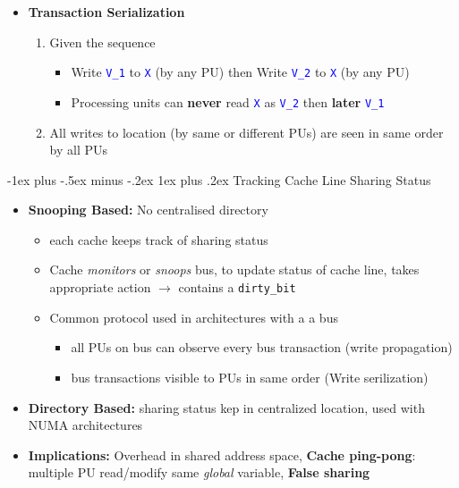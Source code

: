 \documentclass[10pt,landscape]{article}
\makeatletter
\newcommand{\subsubsubsection}{\@startsection{subsubsection}{3}{0mm}%
                                {-1ex plus -.5ex minus -.2ex}%
                                {1ex plus .2ex}%
                                {\normalfont\scriptsize\bfseries}}
\makeatother
\begin{document}
\begin{multicols*}{3}
\begin{itemize}[topsep=0pt,noitemsep,wide=0pt, leftmargin=\dimexpr{} + 2\relax]
\begin{enumerate}[topsep=0pt,noitemsep,wide=0pt, leftmargin=\dimexpr\labelwidth + 2\labelsep\relax]
    \end{enumerate}
    \item \textbf{Transaction Serialization}
    \begin{enumerate}[topsep=0pt,noitemsep,wide=0pt, leftmargin=\dimexpr\labelwidth + 2\labelsep\relax]
        \item Given the sequence 
        \begin{itemize}[topsep=0pt,noitemsep,wide=0pt, leftmargin=\dimexpr{} + 2\relax]
            \item Write \textcolor{blue}{\texttt{V\_1}} to \textcolor{blue}{\texttt{X}} (by any PU) then Write \textcolor{blue}{\texttt{V\_2}} to \textcolor{blue}{\texttt{X}} (by any PU)
            \item Processing units can \textbf{never} read \textcolor{blue}{\texttt{X}} as \textcolor{blue}{\texttt{V\_2}} then \textbf{later} \textcolor{blue}{\texttt{V\_1}}
        \end{itemize}
        \item All writes to location (by same or different PUs) are seen in same order by all PUs
    \end{enumerate}
\end{itemize}

\subsubsubsection{Tracking Cache Line Sharing Status}
\begin{itemize}[topsep=0pt,noitemsep,wide=0pt, leftmargin=\dimexpr{} + 2\relax]
    \item \textbf{Snooping Based:} No centralised directory
    \begin{itemize}[topsep=0pt,noitemsep,wide=0pt, leftmargin=\dimexpr{} + 2\relax]
        \item each cache keeps track of sharing status
        \item Cache \textit{monitors} or \textit{snoops} bus, to update status of cache line, takes appropriate action  $\rightarrow$ contains a \verb|dirty_bit|
        \item Common protocol used in architectures with a a bus
        \begin{itemize}[topsep=0pt,noitemsep,wide=0pt, leftmargin=\dimexpr{} + 2\relax]
            \item all PUs on bus can observe every bus transaction (write propagation)
            \item bus transactions visible to PUs in same order (Write serilization)
        \end{itemize}
    \end{itemize}
    \item \textbf{Directory Based:} sharing status kep in centralized location, used with NUMA architectures
    \item \textbf{Implications:} Overhead in shared address space, \textbf{Cache ping-pong}: multiple PU read/modify same \textit{global} variable, \textbf{False sharing}
\end{itemize}


\end{multicols*}
\end{document}
